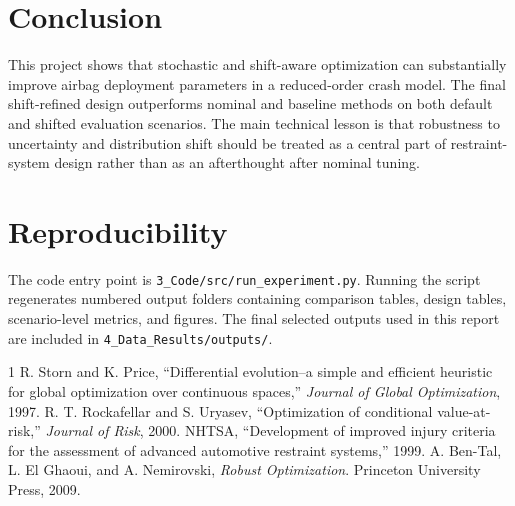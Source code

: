 \documentclass[conference]{IEEEtran}
\begin{document}
\section{Conclusion}
This project shows that stochastic and shift-aware optimization can substantially improve airbag deployment parameters in a reduced-order crash model. The final shift-refined design outperforms nominal and baseline methods on both default and shifted evaluation scenarios. The main technical lesson is that robustness to uncertainty and distribution shift should be treated as a central part of restraint-system design rather than as an afterthought after nominal tuning.

\section*{Reproducibility}
The code entry point is \texttt{3\_Code/src/run\_experiment.py}. Running the script regenerates numbered output folders containing comparison tables, design tables, scenario-level metrics, and figures. The final selected outputs used in this report are included in \texttt{4\_Data\_Results/outputs/}.

\begin{thebibliography}{1}
R. Storn and K. Price, ``Differential evolution--a simple and efficient heuristic for global optimization over continuous spaces,'' \emph{Journal of Global Optimization}, 1997.
R. T. Rockafellar and S. Uryasev, ``Optimization of conditional value-at-risk,'' \emph{Journal of Risk}, 2000.
NHTSA, ``Development of improved injury criteria for the assessment of advanced automotive restraint systems,'' 1999.
A. Ben-Tal, L. El Ghaoui, and A. Nemirovski, \emph{Robust Optimization}. Princeton University Press, 2009.
\end{thebibliography}
\end{document}
